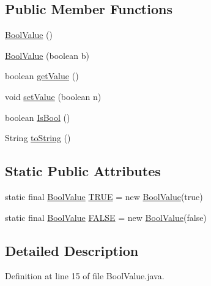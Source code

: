\subsection*{Public Member Functions}
\begin{DoxyCompactItemize}
\item 
\hyperlink{classuran_1_1formula_1_1value_1_1_bool_value_ab75d7d7bd1d808aa9332300d345a6392}{Bool\+Value} ()
\item 
\hyperlink{classuran_1_1formula_1_1value_1_1_bool_value_a07f50b1039186e22dd580052d8af77e4}{Bool\+Value} (boolean b)
\item 
boolean \hyperlink{classuran_1_1formula_1_1value_1_1_bool_value_a3793758209ff1ab589e0d82b79161791}{get\+Value} ()
\item 
void \hyperlink{classuran_1_1formula_1_1value_1_1_bool_value_a01d8351e393778f739c3628a5b29dde3}{set\+Value} (boolean n)
\item 
boolean \hyperlink{classuran_1_1formula_1_1value_1_1_bool_value_af8bccd2ef7c5d744e19252a0271b7cfa}{Is\+Bool} ()
\item 
String \hyperlink{classuran_1_1formula_1_1value_1_1_bool_value_af60d21a25ebdfb22998f474a46db089e}{to\+String} ()
\end{DoxyCompactItemize}
\subsection*{Static Public Attributes}
\begin{DoxyCompactItemize}
\item 
static final \hyperlink{classuran_1_1formula_1_1value_1_1_bool_value}{Bool\+Value} \hyperlink{classuran_1_1formula_1_1value_1_1_bool_value_aa3ce9a9ee8cda8144593e4c4d54151b2}{T\+R\+U\+E} = new \hyperlink{classuran_1_1formula_1_1value_1_1_bool_value}{Bool\+Value}(true)
\item 
static final \hyperlink{classuran_1_1formula_1_1value_1_1_bool_value}{Bool\+Value} \hyperlink{classuran_1_1formula_1_1value_1_1_bool_value_aa95a1b324774790da1c3aea1993baf73}{F\+A\+L\+S\+E} = new \hyperlink{classuran_1_1formula_1_1value_1_1_bool_value}{Bool\+Value}(false)
\end{DoxyCompactItemize}


\subsection{Detailed Description}


Definition at line 15 of file Bool\+Value.\+java.



